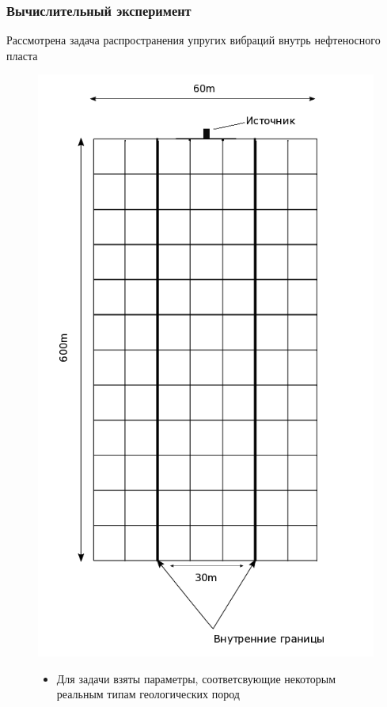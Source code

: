 \documentclass[unicode,aspectratio=43]{beamer}
\begin{document}
\begin{frame}\frametitle{Вычислительный эксперимент}
	\footnotesize
Рассмотрена задача распространения упругих вибраций внутрь нефтеносного пласта
	\begin{figure}[ht!]
		\centering
		\begin{minipage}{0.5\textwidth}
			\centering
		\includegraphics[scale=0.2]{area}
		\end{minipage}
		\hfill
		\begin{minipage}{0.49\textwidth}
	\begin{itemize}
		\footnotesize
		\item Для задачи взяты параметры, соответсвующие некоторым реальным типам геологических пород
		

\end{itemize}
\end{minipage}
\end{figure}
\end{frame}
\end{document}
